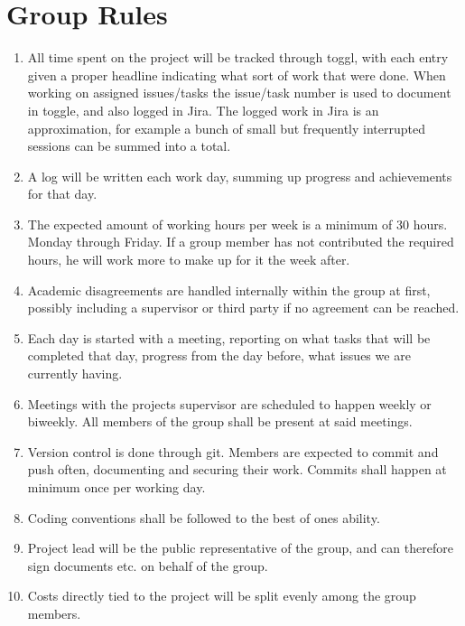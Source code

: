 \documentclass{article}
\begin{document}
\section*{Group Rules}

\begin{enumerate}
    \item
        All time spent on the project will be tracked through toggl, with each entry given a proper headline indicating what sort of work that were done.
        When working on assigned issues/tasks the issue/task number is used to document in toggle, and also logged in Jira. 
        The logged work in Jira is an approximation, for example a bunch of small but frequently interrupted sessions can be summed into a total.
    
    \item
        A log will be written each work day, summing up progress and achievements for that day.
    
    \item 
        The expected amount of working hours per week is a minimum of 30 hours. 
        Monday through Friday. 
        If a group member has not contributed the required hours, he will work more to make up for it the week after.

    \item
        Academic disagreements are handled internally within the group at first, possibly including a supervisor or third party if no agreement can be reached.
    
    \item 
        Each day is started with a meeting, reporting on what tasks that will be completed that day, progress from the day before, what issues we are currently having. 
    
    \item 
        Meetings with the projects supervisor are scheduled to happen weekly or biweekly.
        All members of the group shall be present at said meetings.
    
    \item 
        Version control is done through git. Members are expected to commit and push often, documenting and securing their work.
        Commits shall happen at minimum once per working day.
             
    \item 
        Coding conventions shall be followed to the best of ones ability.

    \item
        Project lead will be the public representative of the group, and can therefore sign documents etc. on behalf of the group.

    \item
        Costs directly tied to the project will be split evenly among the group members.
\end{enumerate}
\end{document}

